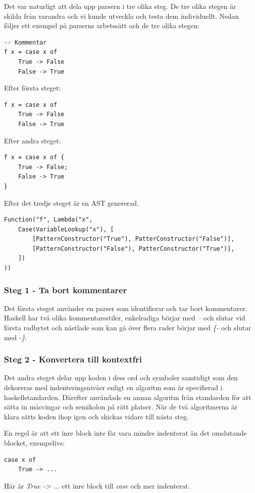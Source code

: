 Det var naturligt att dela upp parsern i tre olika steg. De tre olika stegen är skilda från varandra och vi kunde utveckla och testa dem individuellt.
Nedan följer ett exempel på parserns arbetssätt och de tre olika stegen:
\begin{lstlisting}
-- Kommentar
f x = case x of
    True -> False
    False -> True
\end{lstlisting}

Efter första steget:
\begin{lstlisting}
f x = case x of
    True -> False
    False -> True
\end{lstlisting}

Efter andra steget:
\begin{lstlisting}
f x = case x of {
    True -> False;
    False -> True
}
\end{lstlisting}

Efter det tredje steget är en AST genererad.
\begin{lstlisting}
Function("f", Lambda("x", 
    Case(VariableLookup("x"), [
        [PatternConstructor("True"), PatterConstructor("False")],
        [PatternConstructor("False"), PatterConstructor("True")],
    ])
))
\end{lstlisting}

\subsubsection{Steg 1 - Ta bort kommentarer}
Det första steget använder en parser som identifierar och tar bort kommentarer. 
Haskell har två olika kommentarsstiler, enkelradiga börjar med \emph{--} och slutar vid första radbytet och 
nästlade som kan gå över flera rader börjar med \emph{\{-} och slutar med \emph{-\}}.

\subsubsection{Steg 2 - Konvertera till kontextfri}
Det andra steget delar upp koden i dess ord och symboler samtidigt som den dekoreras med indenteringsnivåer enligt en algoritm %
som är specifierad i haskellstandarden. Därefter användads en annan algoritm från standarden för att sätta in måsvingar och semikolon på rätt platser. %
När de två algoritmerna är klara sätts koden ihop igen och skickas vidare till nästa steg.

En regel är att ett inre block inte får vara mindre indenterat än det omslutande blocket, exempelivs:
\begin{lstlisting}
case x of
    True -> ...
\end{lstlisting}
Här är \emph{True -> ...} ett inre block till \emph{case} och mer indenterat.

